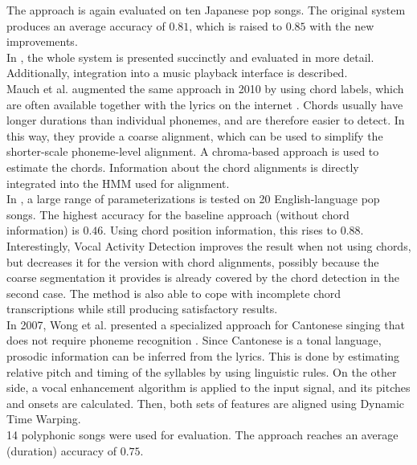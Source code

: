 The approach is again evaluated on ten Japanese pop songs. The original system produces an average accuracy of $0.81$, which is raised to $0.85$ with the new improvements.\\
In \cite{FujiharaGOO11}, the whole system is presented succinctly and evaluated in more detail. Additionally, integration into a music playback interface is described.\\

Mauch et al. augmented the same approach in 2010 by using chord labels, which are often available together with the lyrics on the internet \cite{mauch_alignment2010}  \cite{mauch_alignment2}. Chords usually have longer durations than individual phonemes, and are therefore easier to detect. In this way, they provide a coarse alignment, which can be used to simplify the shorter-scale phoneme-level alignment. A chroma-based approach is used to estimate the chords. Information about the chord alignments is directly integrated into the HMM used for alignment.\\
In \cite{mauch_alignment2}, a large range of parameterizations is tested on 20 English-language pop songs. The highest accuracy for the baseline approach (without chord information) is $0.46$. Using chord position information, this rises to $0.88$. Interestingly, Vocal Activity Detection improves the result when not using chords, but decreases it for the version with chord alignments, possibly because the coarse segmentation it provides is already covered by the chord detection in the second case. The method is also able to cope with incomplete chord transcriptions while still producing satisfactory results.\\

In 2007, Wong et al. presented a specialized approach for Cantonese singing that does not require phoneme recognition \cite{WongSW07}. Since Cantonese is a tonal language, prosodic information can be inferred from the lyrics. This is done by estimating relative pitch and timing of the syllables by using linguistic rules. On the other side, a vocal enhancement algorithm is applied to the input signal, and its pitches and onsets are calculated. Then, both sets of features are aligned using Dynamic Time Warping.\\ 
14 polyphonic songs were used for evaluation. The approach reaches an average (duration) accuracy of $0.75$.\\

